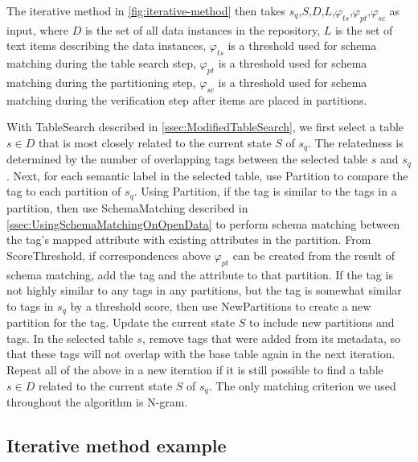 The iterative method in \autoref{fig:iterative-method} then takes $s_q$,$S$,$D$,$L$,$\ensuremath{\varphi}_{ts}$,$\ensuremath{\varphi}_{pt}$,$\ensuremath{\varphi}_{sc}$ as input, where $D$ is the set of all data instances in the repository, $L$ is the set of text items describing the data instances, $\ensuremath{\varphi}_{ts}$ is a threshold used for schema matching during the table search step, $\ensuremath{\varphi}_{pt}$ is a threshold used for schema matching during the partitioning step, $\ensuremath{\varphi}_{sc}$ is a threshold used for schema matching during the verification step after items are placed in partitions.

With TableSearch described in \autoref{ssec:ModifiedTableSearch}, we first select a table $s\in D$ that is most closely related to the current state $S$ of $s_q$. The relatedness is determined by the number of overlapping tags between the selected table $s$ and $s_q$. Next, for each semantic label in the selected table, use Partition to compare the tag to each partition of $s_q$. Using Partition, if the tag is similar to the tags in a partition, then use SchemaMatching described in \autoref{ssec:UsingSchemaMatchingOnOpenData} to perform schema matching between the tag's mapped attribute with existing attributes in the partition. From ScoreThreshold, if correspondences above $\ensuremath{\varphi}_{pt}$ can be created from the result of schema matching, add the tag and the attribute to that partition. If the tag is not highly similar to any tags in any partitions, but the tag is somewhat similar to tags in $s_q$ by a threshold score, then use NewPartitions to create a new partition for the tag. Update the current state $S$ to include new partitions and tags. In the selected table $s$, remove tags that were added from its metadata, so that these tags will not overlap with the base table again in the next iteration. Repeat all of the above in a new iteration if it is still possible to find a table $s\in D$ related to the current state $S$ of $s_q$. The only matching criterion we used throughout the algorithm is N-gram.

\subsection{Iterative method example}
\label{ssec:IterativeMethodExample}

